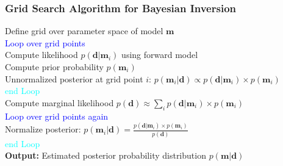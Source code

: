 \documentclass[aspectratio=169]{beamer}
\begin{document}
\begin{frame}
\frametitle{\textbf{Grid Search Algorithm for Bayesian Inversion}}
\footnotesize
Define grid over parameter space of model $\mathbf{m}$ \\
\textcolor{blue}{Loop over grid points}\\
\hspace{1cm} Compute likelihood \( p(\mathbf{d}|\mathbf{m}_i) \) using forward model \vspace{0.1cm}\\
\hspace{1cm} Compute prior probability \( p(\mathbf{m}_i) \) \vspace{0.1cm}\\
\hspace{1cm} Unnormalized posterior at grid point $i$: \( p(\mathbf{m}_i|\mathbf{d}) \propto p(\mathbf{d}|\mathbf{m}_i) \times p(\mathbf{m}_i) \) \vspace{0.1cm}\\
\textcolor{cyan}{end Loop}\\
Compute marginal likelihood \( p(\mathbf{d}) \approx \sum_i p(\mathbf{d}|\mathbf{m}_i) \times p(\mathbf{m}_i) \) \\
\textcolor{blue}{Loop over grid points again}\\
\hspace{1cm} Normalize posterior: \( p(\mathbf{m}_i|\mathbf{d}) = \frac{p(\mathbf{d}|\mathbf{m}_i) \times p(\mathbf{m}_i)}{p(\mathbf{d})} \) \vspace{0.1cm}\\
\textcolor{cyan}{end Loop}\\
\textbf{Output:} Estimated posterior probability distribution \( p(\mathbf{m}|\mathbf{d}) \)\\
\end{frame}
\end{document}
